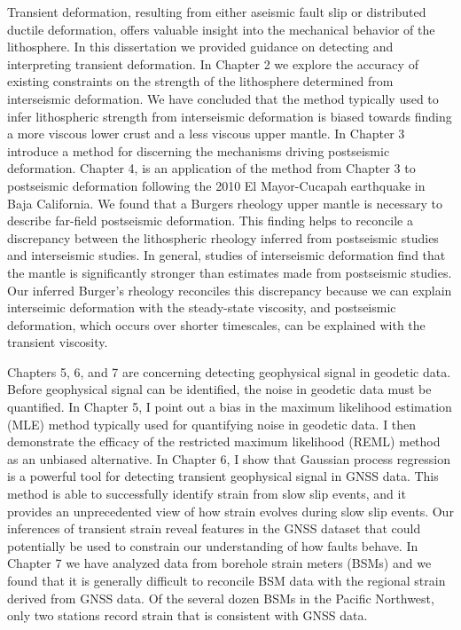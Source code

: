 Transient deformation, resulting from either aseismic fault slip or
distributed ductile deformation, offers valuable insight into the
mechanical behavior of the lithosphere. In this dissertation we
provided guidance on detecting and interpreting transient deformation.
In Chapter 2 we explore the accuracy of existing constraints on the
strength of the lithosphere determined from interseismic deformation.
We have concluded that the method typically used to infer lithospheric
strength from interseismic deformation is biased towards finding a
more viscous lower crust and a less viscous upper mantle. In Chapter 3
introduce a method for discerning the mechanisms driving postseismic
deformation. Chapter 4, is an application of the method from Chapter 3
to postseismic deformation following the 2010 El Mayor-Cucapah
earthquake in Baja California. We found that a Burgers rheology upper
mantle is necessary to describe far-field postseismic deformation.
This finding helps to reconcile a discrepancy between the lithospheric
rheology inferred from postseismic studies and interseismic studies.
In general, studies of interseismic deformation find that the mantle
is significantly stronger than estimates made from postseismic
studies. Our inferred Burger's rheology reconciles this discrepancy
because we can explain interseimic deformation with the steady-state
viscosity, and postseismic deformation, which occurs over shorter
timescales, can be explained with the transient viscosity.

Chapters 5, 6, and 7 are concerning detecting geophysical signal in
geodetic data. Before geophysical signal can be identified, the noise
in geodetic data must be quantified. In Chapter 5, I point out a bias
in the maximum likelihood estimation (MLE) method typically used for
quantifying noise in geodetic data. I then demonstrate the efficacy of
the restricted maximum likelihood (REML) method as an unbiased
alternative. In Chapter 6, I show that Gaussian process regression is
a powerful tool for detecting transient geophysical signal in GNSS
data. This method is able to successfully identify strain from slow
slip events, and it provides an unprecedented view of how strain
evolves during slow slip events. Our inferences of transient strain
reveal features in the GNSS dataset that could potentially be used to
constrain our understanding of how faults behave. In Chapter 7 we have
analyzed data from borehole strain meters (BSMs) and we found that it
is generally difficult to reconcile BSM data with the regional strain
derived from GNSS data. Of the several dozen BSMs in the Pacific
Northwest, only two stations record strain that is consistent with
GNSS data.
